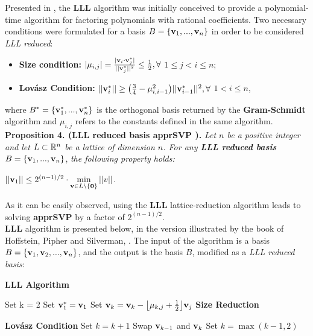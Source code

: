 Presented in \cite{LLL82}, the \textbf{LLL} algorithm was initially conceived to provide a polynomial-time algorithm for factoring polynomials with rational coefficients. Two necessary conditions were formulated for a basis $B = \{\textbf{v}_1, ..., \textbf{v}_n\}$ in order to be considered \textit{LLL reduced}:

\begin{itemize}
	\item \textbf{Size condition:} $|\mu_{i,j}| =  \frac{|\textbf{v}_i \cdot \textbf{v}_j^*|}{||\textbf{v}_j^*||^2} \leq \frac{1}{2}, \forall$ $ 1 \leq j < i \leq n$;
	
	\item \textbf{Lov\'asz Condition:} $|| \textbf{v}_i^* || \geq \big( \frac{3}{4} - \mu_{i,i-1}^2 \big) ||\textbf{v}_{i-1}^*||^2, \forall $ $1 < i \leq n$,
\end{itemize}
where $B^* = \{\textbf{v}_1^*, ..., \textbf{v}_n^*\}$ is the orthogonal basis returned by the \textbf{Gram-Schmidt} algorithm and $\mu_{i,j}$ refers to the constants defined in the same algorithm.\\

\textbf{Proposition 4. (LLL reduced basis apprSVP \cite{HPS08}).} \textit{ Let $n$ be a positive integer and let $L \subset \mathbb{R}^n$ be a lattice of dimension $n$. For any \textbf{LLL reduced basis}} $B = \{\textbf{v}_1,...,\textbf{v}_n\}$, \textit{the following property holds:}
\begin{center}
	$||\textbf{v}_1|| \leq 2^{(n-1) / 2} \cdot \displaystyle{\min_{\textbf{v}\in L \backslash \{\textbf{0}\}} || v||}$.
\end{center}

As it can be easily observed, using the \textbf{LLL} lattice-reduction algorithm leads to solving \textbf{apprSVP} by a factor of $2^{(n-1)/2}$. \\

\textbf{LLL} algorithm is presented below, in the version illustrated by the book of Hoffstein, Pipher and Silverman, \cite{HPS08}. The input of the algorithm is a basis $B = \{\textbf{v}_1,\textbf{v}_2,...,\textbf{v}_n\}$, and the output is the basis $B$, modified as a \textit{LLL reduced basis}: \\

\begin{tcolorbox}[colframe=black,colback=white,arc=0pt,outer arc=0pt]
	\begin{center}
		\textbf{LLL Algorithm}
	\end{center}
	\begin{algorithmic}[1]
		\State Set k = 2
		\State Set $\textbf{v}_1^* = \textbf{v}_1$
		\State Set $\textbf{v}_k = \textbf{v}_k - \big\lfloor \mu_{k,j} + \frac{1}{2} \big\rfloor \textbf{v}_j$     \Comment \textbf{Size Reduction}
		\EndFor
		
		 \Comment \textbf{Lov\'asz Condition}
		\State Set $k = k + 1$
		\Else 
		\State Swap $\textbf{v}_{k-1}$ and $\textbf{v}_k$ 
		\State Set $k=\max (k-1, 2)$
		\EndIf
		\EndWhile
	\end{algorithmic}
\end{tcolorbox}
~\\

